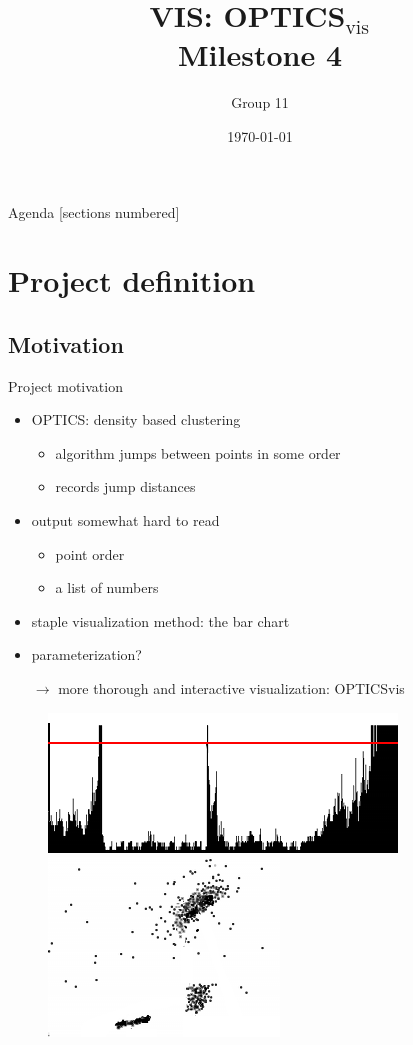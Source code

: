 \documentclass[naustrian]{beamer}
\title{VIS: OPTICS$_\text{vis}$\\Milestone 4}
\date{\today}
\author{Group 11}
\institute{Fakultät für Informatik}
\begin{document}
\maketitle

\begin{frame}{Agenda}
    [sections numbered]
    \tableofcontents
\end{frame}

\section{Project definition}

\subsection{Motivation}

\begin{frame}{Project motivation}
    \begin{itemize}
        \item OPTICS: density based clustering
            \begin{itemize}
                \item algorithm jumps between points in some order
                \item records jump distances
            \end{itemize}
        \item output somewhat hard to read
            \begin{itemize}
                \item point order
                \item a list of numbers
            \end{itemize}
        \item staple visualization method: the bar chart
        \item parameterization?
        \item[$\rightarrow$] more thorough and interactive visualization: OPTICSvis
    \end{itemize}
    \begin{figure}[h]
        \centering
        \includegraphics[height=.3\textheight]{img/optics-edited}
        \vspace{1em}
        \includegraphics[width=.3\textwidth]{img/optics-edited-points-black}
    \end{figure}
\end{frame}
\end{document}
